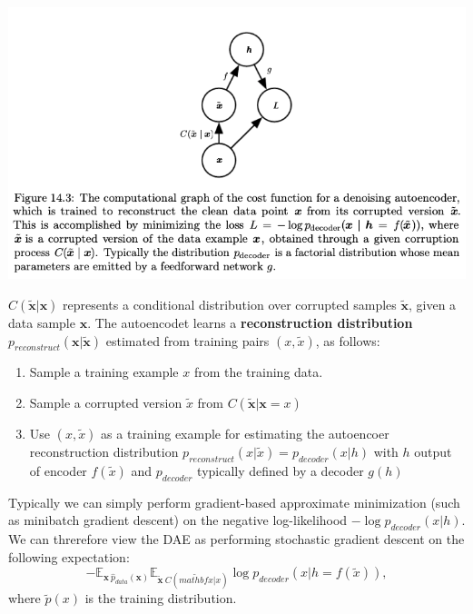 \documentclass[11pt]{article}
\begin{document}
\begin{center}
\includegraphics[width=.9\linewidth]{pics/figure14.3-denoising-autoencoder.png}
\end{center}

\(C(\tilde{\mathbf{x}}|\mathbf{x})\) represents a conditional distribution over corrupted samples \(\tilde{\mathbf{x}}\), given a data sample \(\mathbf{x}\). The autoencodet learns a \textbf{reconstruction distribution} \(p_{reconstruct}(\mathbf{x}|\tilde{\mathbf{x}})\) estimated from training pairs \((x,\tilde{x})\), as follows:\\
\begin{enumerate}
\item Sample a training example \(x\) from the training data.\\
\item Sample a corrupted version \(\tilde{x}\) from \(C(\tilde{\mathbf{x}}|\mathbf{x}=x)\)\\
\item Use \((x,\tilde{x})\) as a training example for estimating the autoencoer reconstruction distribution \(p_{reconstruct}(x|\tilde{x})=p_{decoder}(x|h)\) with \(h\) output of encoder \(f(\tilde{x})\) and \(p_{decoder}\) typically defined by a decoder \(g(h)\)\\
\end{enumerate}


Typically we can simply perform gradient-based approximate minimization (such as minibatch gradient descent) on the negative log-likelihood \(− \log p_{decoder}(x | h)\).\\


We can threrefore view the DAE as performing stochastic gradient descent on the following expectation:\\
\begin{equation}
-\mathbb{E}_{\mathbf{x}~\hat{p}_{data}(\mathbf{x})} \mathbb{E}_{\tilde{\mathbf{x}}~C(\tilde{mathbf{x}}|x)} \log p_{decoder}(x|h=f(\tilde{x})),
\end{equation}
where \(\tilde{p}(x)\) is the training distribution.\\
\end{document}
